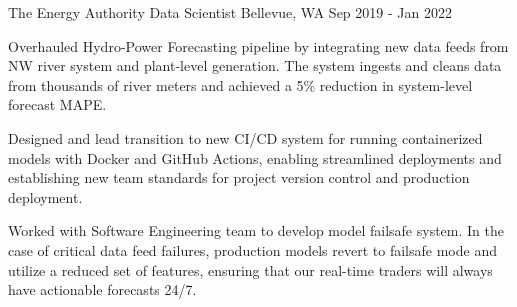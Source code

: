 \begin{cventries}
  \cveducationentry
    {The Energy Authority} %
    {Data Scientist} %
    {Bellevue, WA} %
    {Sep 2019 - Jan 2022} %
    {
      \begin{cvitems} %
        \item {Overhauled Hydro-Power Forecasting pipeline by integrating new data feeds from NW river system and plant-level generation. The system ingests and cleans data from thousands of river meters and achieved a 5\% reduction in system-level forecast MAPE.}
        \item {Designed and lead transition to new CI/CD system for running containerized models with Docker and GitHub Actions, enabling streamlined deployments and establishing new team standards for project version control and production deployment.}
        \item {Worked with Software Engineering team to develop model failsafe system. In the case of critical data feed failures, production models revert to failsafe mode and utilize a reduced set of features, ensuring that our real-time traders will always have actionable forecasts 24/7.}
      \end{cvitems}
    }


\end{cventries}
